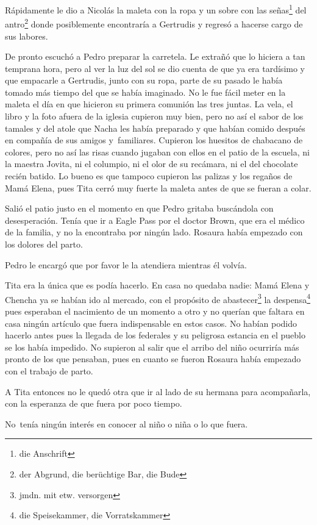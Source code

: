 Rápidamente le dio a Nicolás la maleta con la ropa y un sobre con las señas\footnote{die Anschrift} del antro\footnote{der Abgrund, die berüchtige Bar, die Bude}
donde posiblemente encontraría a Gertrudis y regresó a
hacerse cargo de sus labores.

De pronto escuchó a Pedro preparar la carretela. Le extrañó que lo
hiciera a tan temprana hora, pero al ver la luz del sol se dio cuenta de
que ya era tardísimo y que empacarle a Gertrudis, junto con su ropa,
parte de su pasado le había tomado más tiempo del que se había
imaginado. No le fue fácil meter en la maleta el día en que hicieron su
primera comunión las tres juntas. La vela, el libro y la foto afuera de
la iglesia cupieron muy bien, pero no así el sabor de los tamales y del
atole que Nacha les había preparado y que habían comido después en
compañía de sus amigos y~familiares. Cupieron los huesitos de
chabacano de colores, pero no así las risas cuando jugaban con ellos en
el patio de la escuela, ni la maestra Jovita, ni el columpio, ni el olor
de su recámara, ni el del chocolate recién batido. Lo bueno es que
tampoco cupieron las palizas y los regaños de Mamá Elena, pues Tita
cerró muy fuerte la maleta antes de que se fueran a colar.

Salió el patio justo en el momento en que Pedro gritaba buscándola con
desesperación. Tenía que ir a Eagle Pass por el doctor Brown, que era el
médico de la familia, y no la encontraba por ningún lado. Rosaura había
empezado con los dolores del parto.

Pedro le encargó que por favor le la atendiera mientras él volvía.

Tita era la única que es podía hacerlo. En casa no quedaba nadie: Mamá
Elena y Chencha ya se habían ido al mercado, con el propósito de abastecer\footnote{jmdn. mit etw. versorgen}
la despensa\footnote{die Speisekammer, die Vorratskammer} pues
esperaban el nacimiento de un momento a otro y no querían que faltara en
casa ningún artículo que fuera indispensable en estos casos. No habían podido
hacerlo antes pues la llegada de los federales y su peligrosa estancia
en el pueblo se los había impedido.
No supieron al salir que el arribo
del niño ocurriría más pronto de los que pensaban, pues en cuanto se
fueron Rosaura había empezado con el trabajo de parto.

A Tita entonces no le quedó otra que ir al lado de su hermana para
acompañarla, con la esperanza de que fuera por poco tiempo.

No~tenía ningún interés en conocer al niño o niña o lo que fuera.

